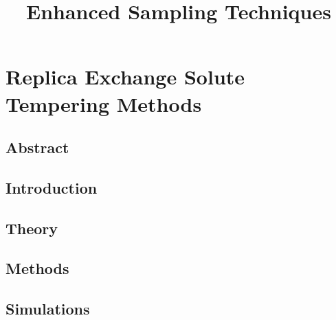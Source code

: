 \documentclass{memoir}
\title{Enhanced Sampling Techniques}
\begin{document}
\date{}

\maketitle

\tableofcontents

\chapter{Replica Exchange Solute Tempering Methods}

\section{Abstract}


\section{Introduction}

  
\section{Theory} 



\section{Methods}



\section{Simulations}





\end{document}
